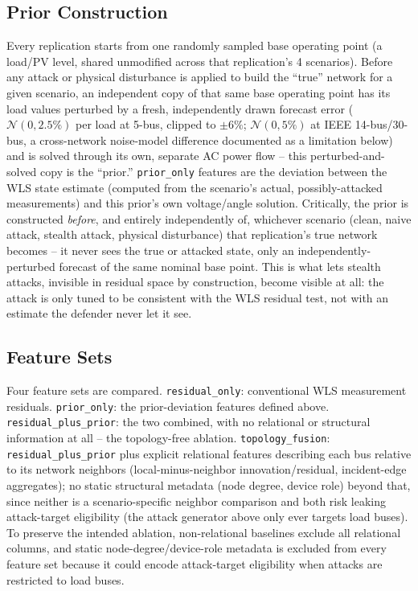 \documentclass[conference]{IEEEtran}
\begin{document}
\subsection{Prior Construction}
Every replication starts from one randomly sampled base operating point (a load/PV level, shared unmodified across that replication's 4 scenarios). Before any attack or physical disturbance is applied to build the ``true'' network for a given scenario, an independent copy of that same base operating point has its load values perturbed by a fresh, independently drawn forecast error ($\mathcal{N}(0, 2.5\%)$ per load at 5-bus, clipped to $\pm6\%$; $\mathcal{N}(0, 5\%)$ at IEEE 14-bus/30-bus, a cross-network noise-model difference documented as a limitation below) and is solved through its own, separate AC power flow -- this perturbed-and-solved copy is the ``prior.'' \texttt{prior\_only} features are the deviation between the WLS state estimate (computed from the scenario's actual, possibly-attacked measurements) and this prior's own voltage/angle solution. Critically, the prior is constructed \emph{before}, and entirely independently of, whichever scenario (clean, naive attack, stealth attack, physical disturbance) that replication's true network becomes -- it never sees the true or attacked state, only an independently-perturbed forecast of the same nominal base point. This is what lets stealth attacks, invisible in residual space by construction, become visible at all: the attack is only tuned to be consistent with the WLS residual test, not with an estimate the defender never let it see.

\subsection{Feature Sets}
Four feature sets are compared. \texttt{residual\_only}: conventional WLS measurement residuals. \texttt{prior\_only}: the prior-deviation features defined above. \texttt{residual\_plus\_prior}: the two combined, with no relational or structural information at all -- the topology-free ablation. \texttt{topology\_fusion}: \texttt{residual\_plus\_prior} plus explicit relational features describing each bus relative to its network neighbors (local-minus-neighbor innovation/residual, incident-edge aggregates); no static structural metadata (node degree, device role) beyond that, since neither is a scenario-specific neighbor comparison and both risk leaking attack-target eligibility (the attack generator above only ever targets load buses). To preserve the intended ablation, non-relational baselines exclude all relational columns, and static node-degree/device-role metadata is excluded from every feature set because it could encode attack-target eligibility when attacks are restricted to load buses.
\end{document}

